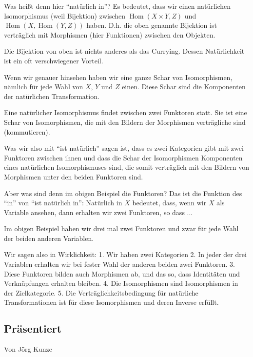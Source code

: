 \documentclass[a4paper]{amsart}
\theoremstyle{definition}
\DeclareMathOperator{\Hom}{Hom}
\begin{document}
Was heißt denn hier "`natürlich in"'? Es bedeutet, dass wir einen natürlichen Isomorphismus (weil Bijektion) zwischen $\Hom( X \times Y, Z )$ und $\Hom( X, \Hom( Y, Z ))$ haben. D.h. die oben genannte Bijektion ist verträglich mit Morphismen (hier Funktionen) zwischen den Objekten.

Die Bijektion von oben ist nichts anderes als das Currying. Dessen Natürlichkeit ist ein oft verschwiegener Vorteil.

Wenn wir genauer hinsehen haben wir eine ganze Schar von Isomorphismen, nämlich für jede Wahl von $X$, $Y$ und $Z$ einen. Diese Schar sind die Komponenten der natürlichen Transformation.

Eine natürlicher Isomorphismus findet zwischen zwei Funktoren statt. Sie ist eine Schar von Isomorphismen, die mit den Bildern der Morphismen verträgliche sind (kommutieren).

Was wir also mit "`ist natürlich"' sagen ist, dass es zwei Kategorien gibt mit zwei Funktoren zwischen ihnen und dass die Schar der Isomorphismen Komponenten eines natürlichen Isomorphismuses sind, die somit verträglich mit den Bildern von Morphismen unter den beiden Funktoren sind.

Aber was sind denn im obigen Beispiel die Funktoren? Das ist die Funktion des "`in"' von "`ist natürlich in"': Natürlich in $X$ bedeutet, dass, wenn wir $X$ als Variable ansehen, dann erhalten wir zwei Funktoren, so dass ...

Im obigen Beispiel haben wir drei mal zwei Funktoren und zwar für jede Wahl der beiden anderen Variablen.

Wir sagen also in Wirklichkeit:
1. Wir haben zwei Kategorien
2. In jeder der drei Variablen erhalten wir bei fester Wahl der anderen beiden zwei Funktoren.
3. Diese Funktoren bilden auch Morphismen ab, und das so, dass Identitäten und Verknüpfungen erhalten bleiben.
4. Die Isomorphismen sind Isomorphismen in der Zielkategorie.
5. Die Verträglichkeitsbedingung für natürliche Transformationen ist für diese Isomorphismen und deren Inverse erfüllt.

\subsection*{Präsentiert}
Von Jörg Kunze
\end{document}
